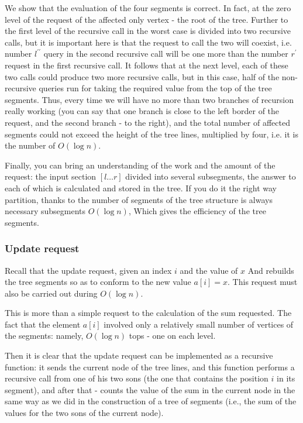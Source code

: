 We show that the evaluation of the four segments is correct. In fact, at the zero level of the request of the affected only vertex - the root of the tree. Further to the first level of the recursive call in the worst case is divided into two recursive calls, but it is important here is that the request to call the two will coexist, i.e. number $l ^ {\prime \prime}$ query in the second recursive call will be one more than the number $r ^ \prime$ request in the first recursive call. It follows that at the next level, each of these two calls could produce two more recursive calls, but in this case, half of the non-recursive queries run for taking the required value from the top of the tree segments. Thus, every time we will have no more than two branches of recursion really working (you can say that one branch is close to the left border of the request, and the second branch - to the right), and the total number of affected segments could not exceed the height of the tree lines, multiplied by four, i.e. it is the number of $O (\log n)$.

Finally, you can bring an understanding of the work and the amount of the request: the input section $[l \ldots r]$ divided into several subsegments, the answer to each of which is calculated and stored in the tree. If you do it the right way partition, thanks to the number of segments of the tree structure is always necessary subsegments $O (\log n)$, Which gives the efficiency of the tree segments.

\subsubsection{ Update request }

Recall that the update request, given an index $i$ and the value of $x$ And rebuilds the tree segments so as to conform to the new value $a [i] = x$. This request must also be carried out during $O (\log n)$.

This is more than a simple request to the calculation of the sum requested. The fact that the element $a [i]$ involved only a relatively small number of vertices of the segments: namely, $O (\log n)$ tops - one on each level.

Then it is clear that the update request can be implemented as a recursive function: it sends the current node of the tree lines, and this function performs a recursive call from one of his two sons (the one that contains the position $i$ in its segment), and after that - counts the value of the sum in the current node in the same way as we did in the construction of a tree of segments (i.e., the sum of the values ​​for the two sons of the current node).

